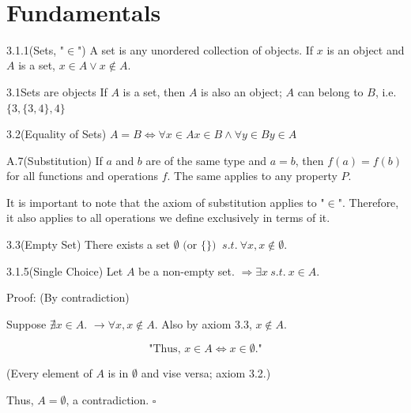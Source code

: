 \documentclass[letterpaper]{article}
\title{\vspace{-3.0cm}\textbf{\T}}
\date{\vspace{-1cm}}
\author{~}
\begin{document}
\maketitle

\section*{Fundamentals}

\begin{defbox}{3.1.1}{(Sets, "$\in$")}
  A set is any unordered collection of objects. If $x$ is an object and $A$ is a set, $x \in A \lor x \notin A$.
\end{defbox}

\begin{axbox}{3.1}{Sets are objects}
  If $A$ is a set, then $A$ is also an object; $A$ can belong to $B$, i.e. $\{3,\{3,4\},4\}$
\end{axbox}

\begin{axbox}{3.2}{(Equality of Sets)}
  $A = B \iff \forall x \in A x \in B \land \forall y \in B y \in A$
\end{axbox}

\begin{axbox}{A.7}{(Substitution)}
  If $a$ and $b$ are of the same type and $a = b$, then $f(a) = f(b)$ for all functions and operations $f$. The same applies to any property $P$.
\end{axbox}

It is important to note that the axiom of substitution applies to "$\in$". Therefore, it also applies to all operations we define exclusively in terms of it.

\begin{axbox}{3.3}{(Empty Set)}
  There exists a set $\emptyset \text{ (or $\{\}$) } ~s.t.~ \forall x, x \notin \emptyset$.
\end{axbox}

\begin{lebox}{3.1.5}{(Single Choice)}
  Let $A$ be a non-empty set. $\Rightarrow \exists x ~s.t.~ x \in A$.
  \begin{paragraph}{Proof:} 
    (By contradiction)

    Suppose $\nexists x \in A$.
    $\to \forall x, x \notin A$.
    Also by axiom 3.3, $x \notin A$.
    
    \[
      \text{"Thus, } x \in A \iff x \in \emptyset.\text{"}
    \]

    (Every element of $A$ is in $\emptyset$ and vise versa; axiom 3.2.)
    
    Thus, $A = \emptyset$, a contradiction. $\square$
  \end{paragraph}
\end{lebox}
\end{document}
